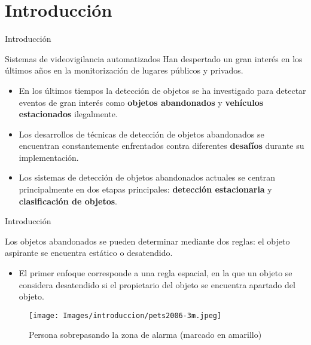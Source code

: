 \section{Introducción}

\begin{frame}{Introducción}

\begin{block}{Sistemas de videovigilancia automatizados}
\justifying
Han despertado un gran interés en los últimos años en la monitorización de lugares públicos y privados.
\vspace{0.2cm}
\end{block}

\begin{itemize}
    \justifying
    \item En los últimos tiempos la detección de objetos se ha investigado para detectar eventos de gran interés como \textbf{objetos abandonados} y \textbf{vehículos estacionados} ilegalmente.
    \item Los desarrollos de técnicas de detección de objetos abandonados se encuentran constantemente enfrentados contra diferentes \textbf{desafíos} durante su implementación.
    \item Los sistemas de detección de objetos abandonados actuales se centran principalmente en dos etapas principales: \textbf{detección estacionaria} y \textbf{clasificación de objetos}.
\end{itemize}

\end{frame}


\begin{frame}{Introducción}

\justifying
Los objetos abandonados se pueden determinar mediante dos reglas: el objeto aspirante se encuentra estático o desatendido.

\vspace{0.1cm}

\begin{itemize}
    \justifying
    \item El primer enfoque corresponde a una regla espacial, en la que un objeto se considera desatendido si el propietario del objeto se encuentra apartado del objeto.
    
\end{itemize}
    
\vspace{0.3cm}

\begin{figure}[ht]
\centering
\texttt{[image: Images/introduccion/pets2006-3m.jpeg]}
\caption{\label{fig:pets2006-3m}Persona sobrepasando la zona de alarma (marcado en amarillo)}
\end{figure}
    
\end{frame}

